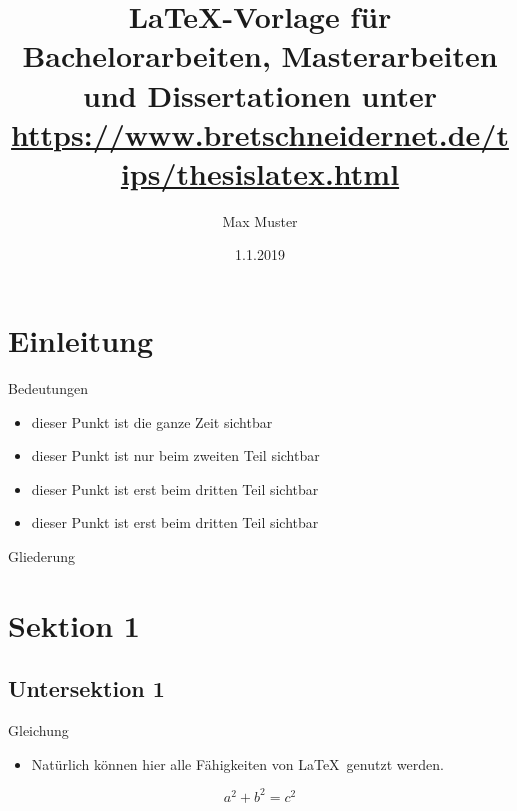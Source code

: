 
\title[Kurztitel]{\LaTeX-Vorlage für Bachelorarbeiten, Masterarbeiten und Dissertationen unter \url{https://www.bretschneidernet.de/tips/thesislatex.html}}
\author{Max Muster} 
\date{1.1.2019}



\frame{\titlepage} %

\section{Einleitung}

\begin{frame}{Bedeutungen}
	\begin{itemize}
		\item<1-> dieser Punkt ist die ganze Zeit sichtbar
		\item<2> dieser Punkt ist nur beim zweiten Teil sichtbar
		\item<3> dieser Punkt ist erst beim dritten Teil sichtbar
		\item<3> dieser Punkt ist erst beim dritten Teil sichtbar
		\end{itemize}
\end{frame}


\begin{frame}{Gliederung}
	\tableofcontents[sections={<2->},firstsection=2]
\end{frame}

\section{Sektion 1}
\subsection{Untersektion 1}
\begin{frame}{Gleichung}
	\begin{itemize}
		\item Natürlich können hier alle Fähigkeiten von \LaTeX\, genutzt werden.
	\end{itemize}
	\begin{equation}
		a^2 + b^2 = c^2
	\end{equation}
\end{frame}


